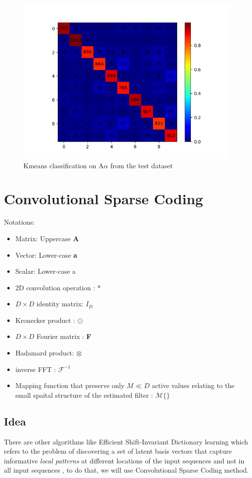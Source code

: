 \documentclass[a4paper,10pt]{article}
\begin{document}
\begin{figure}[h!]
 \centering
 \includegraphics[scale=0.72]{Results/LC-KSVD_X_ALL_K_1024/confusion_matrix_test.png}
 \caption{Kmeans classification on A$\alpha$ from the test dataset}
\end{figure}


\newpage 
\section{Convolutional Sparse Coding}
Notations:
\begin{itemize}
 \item Matrix: Uppercase  \textbf{A}
 \item Vector: Lower-case  \textbf{a}
 \item Scalar: Lower-case a
 \item 2D convolution operation : *
 \item $D \times D$ identity matrix: \textbf{$I_D$}
 \item Kronecker product : $\odot$
 \item $D \times D$ Fourier matrix : \textbf{F}
 \item Hadamard product: $\otimes$
 \item inverse FFT : $ \mathcal{F}^{-1}$
 \item Mapping function that preserve only $M \ll D$ active values relating to the small spaital structure of the estimated filter : $ \mathcal{M}\{\}$
\end{itemize}
\subsection{Idea}
There are other algorithms like Efficient Shift-Invariant Dictionary learning which refers to the problem of discovering a set of latent basis vectors that capture informative \textit{local patterns} at different locations of the input sequences and not in all input sequences \cite{Zheng:2016:ESD:2939672.2939824}, to do that, we will use Convolutional Sparse Coding method.  
\end{document}

